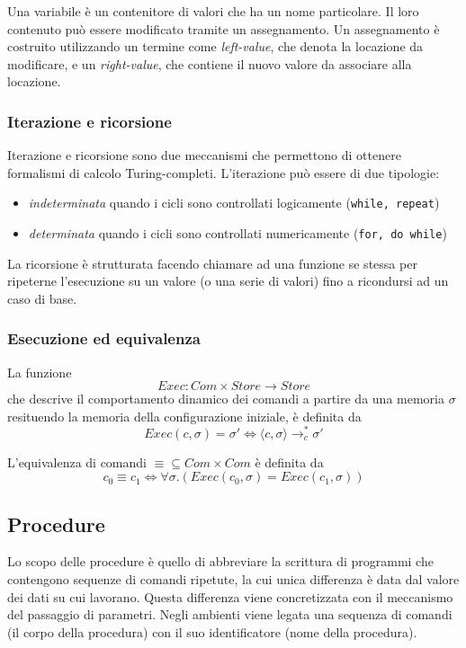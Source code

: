 \documentclass{article}[10pt]
\begin{document}
	Una variabile è un contenitore di valori che ha un nome particolare. Il loro contenuto può essere modificato tramite un assegnamento. Un assegnamento è costruito utilizzando un termine come \textit{left-value}, che denota la locazione da modificare, e un \textit{right-value}, che contiene il nuovo valore da associare alla locazione.
	
	\subsubsection{Iterazione e ricorsione}
	Iterazione e ricorsione sono due meccanismi che permettono di ottenere formalismi di calcolo Turing-completi.
	L'iterazione può essere di due tipologie:
	\begin{itemize}
		\item \textit{indeterminata} quando i cicli sono controllati logicamente (\verb|while, repeat|)
		\item \textit{determinata} quando i cicli sono controllati numericamente (\verb|for, do while|)
	\end{itemize}

	La ricorsione è strutturata facendo chiamare ad una funzione se stessa per ripeterne l'esecuzione su un valore (o una serie di valori) fino a ricondursi ad un caso di base.
	
	\subsubsection{Esecuzione ed equivalenza}
	La funzione $$Exec:Com\times Store \to Store$$ che descrive il comportamento dinamico dei comandi a partire da una memoria $\sigma$ resituendo la memoria della configurazione iniziale, è definita da $$Exec(c, \sigma)=\sigma' \iff \langle c, \sigma \rangle \to_c^* \sigma'$$
	
	L'equivalenza di comandi $\equiv \subseteq Com \times Com$ è definita da $$c_0 \equiv c_1 \iff \forall \sigma.(Exec(c_0, \sigma)=Exec(c_1, \sigma))$$
	
	\subsection{Procedure}
	Lo scopo delle procedure è quello di abbreviare la scrittura di programmi che contengono sequenze di comandi ripetute, la cui unica differenza è data dal valore dei dati su cui lavorano. Questa differenza viene concretizzata con il meccanismo del passaggio di parametri. Negli ambienti viene legata una sequenza di comandi (il corpo della procedura) con il suo identificatore (nome della procedura).
	
\end{document}
